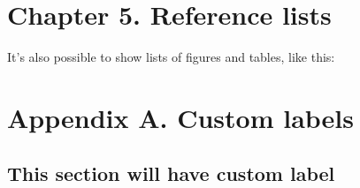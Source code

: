 \hypertarget{sec:chapter-5.-reference-lists}{%
\section{Chapter 5. Reference lists}\label{sec:chapter-5.-reference-lists}}

It's also possible to show lists of figures and tables, like this:

\listoffigures

\listoftables

\listoflistings

\hypertarget{sec:appendix-a.-custom-labels}{%
\section{Appendix A. Custom labels}\label{sec:appendix-a.-custom-labels}}

\hypertarget{sec:custlabs}{%
\subsection{This section will have custom label}\label{sec:custlabs}}
